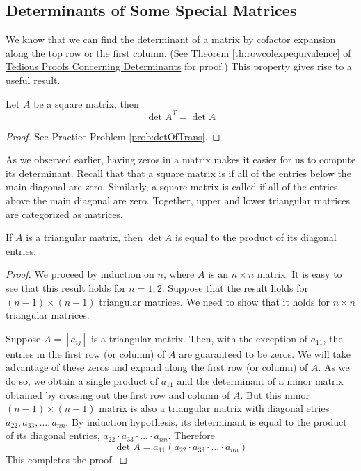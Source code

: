 \documentclass{ximera}
\begin{document}
\subsection*{Determinants of Some Special Matrices}
We know that we can find the determinant of a matrix by cofactor expansion along the top row or the first column.  (See Theorem \ref{th:rowcolexpequivalence} of \href{https://ximera.osu.edu/linearalgebradzv3/LinearAlgebraInteractiveIntro/DET-0050/main}{Tedious Proofs Concerning Determinants} for proof.)  This property gives rise to a useful result.
\begin{theorem}\label{th:detoftrans}
Let $A$ be a square matrix, then
$$\det{A^T}=\det{A}$$
\end{theorem}
\begin{proof}
    See Practice Problem \ref{prob:detOfTrans}.
\end{proof}

As we observed earlier, having zeros in a matrix makes it easier for us to compute its determinant.  Recall that that a square matrix is  if all of the entries below the main diagonal are zero.  Similarly, a square matrix is called  if all of the entries above the main diagonal are zero.  Together, upper and lower triangular matrices are categorized as  matrices.

\begin{theorem}\label{lemma:triangulardet}
If $A$ is a triangular matrix, then $\det{A}$ is equal to the product of its diagonal entries.
\end{theorem}
\begin{proof}
We proceed by induction on $n$, where $A$ is an $n\times n$ matrix.  It is easy to see that this result holds for $n=1, 2$.  Suppose that the result holds for $(n-1)\times (n-1)$ triangular matrices.  We need to show that it holds for $n\times n$ triangular matrices.  

Suppose $A=[a_{ij}]$ is a triangular matrix. Then, with the exception of $a_{11}$, the entries in the first row (or column) of $A$ are guaranteed to be zeros.
  We will take advantage of these zeros and expand along the first row (or column) of $A$.  As we do so, we obtain a single product of $a_{11}$ and the determinant of a minor matrix obtained by crossing out the first row and column of $A$.  But this minor $(n-1)\times (n-1)$ matrix is also a triangular matrix with diagonal etries $a_{22}, a_{33},\ldots, a_{nn}$.  By induction hypothesis, its determinant is equal to the product of its diagonal entries, $a_{22}\cdot a_{33}\cdot\ldots\cdot a_{nn}$.  Therefore $$\det{A}=a_{11}(a_{22}\cdot a_{33}\cdot\ldots\cdot a_{nn})$$
 This completes the proof.
\end{proof}
\end{document}
